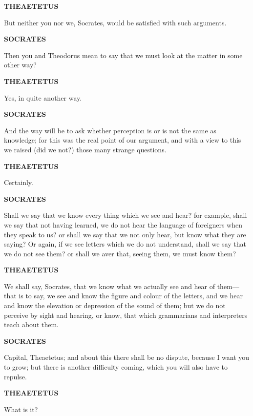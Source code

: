 \documentclass[11pt,letter]{article}
\begin{document}
\par \textbf{THEAETETUS}
\par   But neither you nor we, Socrates, would be satisfied with such arguments.

\par \textbf{SOCRATES}
\par   Then you and Theodorus mean to say that we must look at the matter in some other way?

\par \textbf{THEAETETUS}
\par   Yes, in quite another way.

\par \textbf{SOCRATES}
\par   And the way will be to ask whether perception is or is not the same as knowledge; for this was the real point of our argument, and with a view to this we raised (did we not?) those many strange questions.

\par \textbf{THEAETETUS}
\par   Certainly.

\par \textbf{SOCRATES}
\par   Shall we say that we know every thing which we see and hear? for example, shall we say that not having learned, we do not hear the language of foreigners when they speak to us? or shall we say that we not only hear, but know what they are saying? Or again, if we see letters which we do not understand, shall we say that we do not see them? or shall we aver that, seeing them, we must know them?

\par \textbf{THEAETETUS}
\par   We shall say, Socrates, that we know what we actually see and hear of them—that is to say, we see and know the figure and colour of the letters, and we hear and know the elevation or depression of the sound of them; but we do not perceive by sight and hearing, or know, that which grammarians and interpreters teach about them.

\par \textbf{SOCRATES}
\par   Capital, Theaetetus; and about this there shall be no dispute, because I want you to grow; but there is another difficulty coming, which you will also have to repulse.

\par \textbf{THEAETETUS}
\par   What is it?
\end{document}
